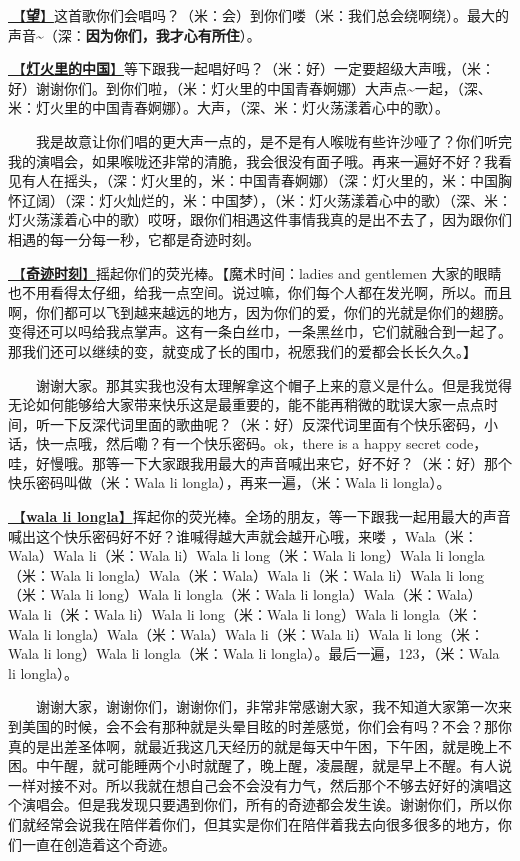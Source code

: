 \documentclass[]{ctexbook}
\begin{document}
\hyperref[hope]{🎵【\textbf{望}】}这首歌你们会唱吗？（米：会）到你们喽（米：我们总会绕啊绕）。最大的声音\textasciitilde（深：\textbf{因为你们，我才心有所住}）。

\hyperref[China-in-the-light]{🎵【\textbf{灯火里的中国}】}等下跟我一起唱好吗？（米：好）一定要超级大声哦，（米：好）谢谢你们。到你们啦，（米：灯火里的中国青春婀娜）大声点\textasciitilde 一起，（深、米：灯火里的中国青春婀娜）。大声，（深、米：灯火荡漾着心中的歌）。

  我是故意让你们唱的更大声一点的，是不是有人喉咙有些许沙哑了？你们听完我的演唱会，如果喉咙还非常的清脆，我会很没有面子哦。再来一遍好不好？我看见有人在摇头，（深：灯火里的，米：中国青春婀娜）（深：灯火里的，米：中国胸怀辽阔）（深：灯火灿烂的，米：中国梦），（米：灯火荡漾着心中的歌）（深、米：灯火荡漾着心中的歌）哎呀，跟你们相遇这件事情我真的是出不去了，因为跟你们相遇的每一分每一秒，它都是奇迹时刻。

\hyperref[magic-moment]{🎵【\textbf{奇迹时刻}】}摇起你们的荧光棒。【魔术时间：ladies and gentlemen 大家的眼睛也不用看得太仔细，给我一点空间。说过嘛，你们每个人都在发光啊，所以。而且啊，你们都可以飞到越来越远的地方，因为你们的爱，你们的光就是你们的翅膀。变得还可以吗给我点掌声。这有一条白丝巾，一条黑丝巾，它们就融合到一起了。那我们还可以继续的变，就变成了长的围巾，祝愿我们的爱都会长长久久。】

  谢谢大家。那其实我也没有太理解拿这个帽子上来的意义是什么。但是我觉得无论如何能够给大家带来快乐这是最重要的，能不能再稍微的耽误大家一点点时间，听一下反深代词里面的歌曲呢？（米：好）反深代词里面有个快乐密码，小话，快一点哦，然后嘞？有一个快乐密码。ok，there is a happy secret code， 哇，好慢哦。那等一下大家跟我用最大的声音喊出来它，好不好？（米：好）那个快乐密码叫做（米：Wala li longla），再来一遍，（米：Wala li longla）。

\hyperref[wala-li-longla]{🎵【\textbf{wala li longla}】}挥起你的荧光棒。全场的朋友，等一下跟我一起用最大的声音喊出这个快乐密码好不好？谁喊得越大声就会越开心哦，来喽 ，Wala（米：Wala）Wala li（米：Wala li）Wala li long（米：Wala li long）Wala li longla（米：Wala li longla）Wala（米：Wala）Wala li（米：Wala li）Wala li long（米：Wala li long）Wala li longla（米：Wala li longla）Wala（米：Wala）Wala li（米：Wala li）Wala li long（米：Wala li long）Wala li longla（米：Wala li longla）Wala（米：Wala）Wala li（米：Wala li）Wala li long（米：Wala li long）Wala li longla（米：Wala li longla）。最后一遍，123，（米：Wala li longla）。

  谢谢大家，谢谢你们，谢谢你们，非常非常感谢大家，我不知道大家第一次来到美国的时候，会不会有那种就是头晕目眩的时差感觉，你们会有吗？不会？那你真的是出差圣体啊，就最近我这几天经历的就是每天中午困，下午困，就是晚上不困。中午醒，就可能睡两个小时就醒了，晚上醒，凌晨醒，就是早上不醒。有人说一样对接不对。所以我就在想自己会不会没有力气，然后那个不够去好好的演唱这个演唱会。但是我发现只要遇到你们，所有的奇迹都会发生诶。谢谢你们，所以你们就经常会说我在陪伴着你们，但其实是你们在陪伴着我去向很多很多的地方，你们一直在创造着这个奇迹。
\end{document}
